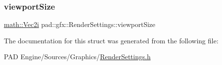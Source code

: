 \subsubsection{\texorpdfstring{viewport\+Size}{viewportSize}}
{\footnotesize\ttfamily \mbox{\hyperlink{namespacepad_1_1math_a808a631a6bccd994f9589d7fb86bad41}{math\+::\+Vec2i}} pad\+::gfx\+::\+Render\+Settings\+::viewport\+Size}



The documentation for this struct was generated from the following file\+:\begin{DoxyCompactItemize}
\item 
P\+A\+D Engine/\+Sources/\+Graphics/\mbox{\hyperlink{_render_settings_8h}{Render\+Settings.\+h}}\end{DoxyCompactItemize}
